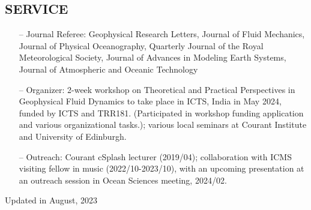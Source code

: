 \documentclass[margin]{res}
\begin{document}
\begin{resume}
\section{{\normalfont SERVICE}}
\begin{itemize}[leftmargin=*,noitemsep]
\item[--]{Journal Referee: Geophysical Research Letters, Journal of Fluid Mechanics, Journal of Physical Oceanography, Quarterly Journal of the Royal Meteorological Society, Journal of Advances in Modeling Earth Systems, Journal of Atmospheric and Oceanic Technology}
\item[--]{Organizer: 2-week workshop on Theoretical and Practical Perspectives in Geophysical Fluid Dynamics to take place in ICTS, India in May 2024, funded by ICTS and TRR181. (Participated in workshop funding application and various organizational tasks.);  various local seminars at Courant Institute and University of Edinburgh.}
\item[--]{Outreach: Courant cSplash lecturer (2019/04); collaboration with ICMS visiting fellow in music (2022/10-2023/10), with an upcoming presentation at an outreach session in Ocean Sciences meeting, 2024/02.}
\end{itemize}
\end{resume}


\begin{flushright}
Updated in August, 2023
\end{flushright}

\end{document}
